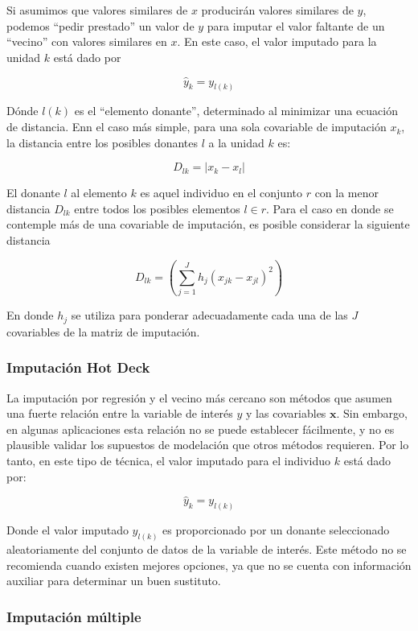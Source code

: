 \documentclass[
  10pt,
  spanish,
]{book}
\begin{document}
Si asumimos que valores similares de \(x\) producirán valores similares de \(y\), podemos ``pedir prestado'' un valor de \(y\) para imputar el valor faltante de un ``vecino'' con valores similares en \(x\). En este caso, el valor imputado para la unidad \(k\) está dado por

\[
\hat{y}_k = y_{l(k)}
\]

Dónde \(l(k)\) es el ``elemento donante'', determinado al minimizar una ecuación de distancia. Enn el caso más simple, para una sola covariable de imputación \(x_k\), la distancia entre los posibles donantes \(l\) a la unidad \(k\) es:

\[
D_{lk} = |x_k - x_l|
\]

El donante \(l\) al elemento \(k\) es aquel individuo en el conjunto \(r\) con la menor distancia \(D_{lk}\) entre todos los posibles elementos \(l\in r\). Para el caso en donde se contemple más de una covariable de imputación, es posible considerar la siguiente distancia

\[
D_{lk} = \left( \sum_{j=1}^J h_j (x_{jk} - x_{jl})^2 \right)
\]

En donde \(h_j\) se utiliza para ponderar adecuadamente cada una de las \(J\) covariables de la matriz de imputación.

\hypertarget{imputaciuxf3n-hot-deck}{%
\subsubsection*{Imputación Hot Deck}\label{imputaciuxf3n-hot-deck}}

La imputación por regresión y el vecino más cercano son métodos que asumen una fuerte relación entre la variable de interés \(y\) y las covariables \(\mathbf{x}\). Sin embargo, en algunas aplicaciones esta relación no se puede establecer fácilmente, y no es plausible validar los supuestos de modelación que otros métodos requieren. Por lo tanto, en este tipo de técnica, el valor imputado para el individuo \(k\) está dado por:

\[
\hat{y}_k = y_{l(k)}
\]

Donde el valor imputado \(y_{l(k)}\) es proporcionado por un donante seleccionado aleatoriamente del conjunto de datos de la variable de interés. Este método no se recomienda cuando existen mejores opciones, ya que no se cuenta con información auxiliar para determinar un buen sustituto.

\hypertarget{imputaciuxf3n-muxfaltiple}{%
\subsubsection*{Imputación múltiple}\label{imputaciuxf3n-muxfaltiple}}
\end{document}
